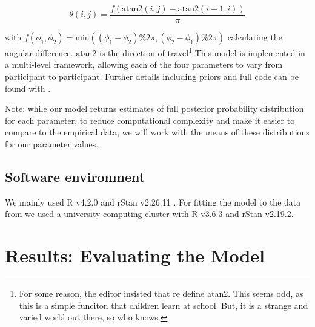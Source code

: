 \documentclass[preprints, article,submit,pdftex,moreauthors]{Definitions/mdpi}
\begin{document}
\begin{linenomath}
\begin{equation}
    \theta(i,j) = \frac{f(\text{atan2}(i, j) - \text{atan2}(i-1, i))}{\pi}
\end{equation}
\end{linenomath}

with $f(\phi_1, \phi_2) = \text{min}((\phi_1 - \phi_2) \% 2\pi, (\phi_2 - \phi_1) \% 2\pi)$ calculating the angular difference. $\text{atan2}$ is the direction of travel\footnote{For some reason, the editor insisted that re define atan2. This seems odd, as this is a simple funciton that children learn at school. But, it is a strange and varied world out there, so who knows.} This model is implemented in a multi-level framework, allowing each of the four parameters to vary from participant to participant. Further details including priors and full code can be found with \cite{clarke2022foraging}.

Note: while our model returns estimates of full posterior probability distribution for each parameter, to reduce computational complexity and make it easier to compare to the empirical data, we will work with the means of these distributions for our parameter values. 

\subsection{Software environment}
 
We mainly used R v4.2.0 and rStan v2.26.11 \cite{rstan}. For fitting the model to the data from \cite{clarke2022} we used a university computing cluster with R v3.6.3 and rStan v2.19.2.

\section{Results: Evaluating the Model}
\end{document}
